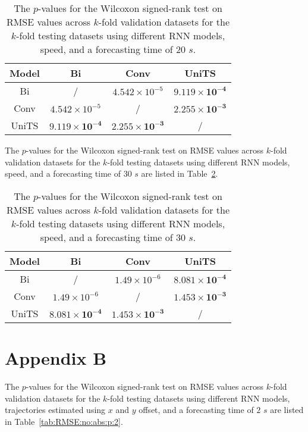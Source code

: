 \begin{table}[!ht]
	\centering
	\begin{tabular}{|c|c|c|c|}
		\hline
		Model & Bi & Conv & UniTS \\ \hline
		Bi & / & $4.542 \times 10^{-5}$ & $\mathbf{9.119 \times 10^{-4}}$ \\ \hline
		Conv & $4.542 \times 10^{-5}$ & / & $\mathbf{2.255 \times 10^{-3}}$ \\ \hline
		UniTS & $\mathbf{9.119 \times 10^{-4}}$ & $\mathbf{2.255 \times 10^{-3}}$ & / \\ \hline
	\end{tabular}
	\caption{The $p$-values for the Wilcoxon signed-rank test on RMSE values across $k$-fold validation datasets for the $k$-fold testing datasets using different RNN models, speed, and a forecasting time of $20$ $s$.}
	\label{tab:RMSE:speed:p:20}
\end{table}

The $p$-values for the Wilcoxon signed-rank test on RMSE values across $k$-fold validation datasets for the $k$-fold testing datasets using different RNN models, speed, and a forecasting time of $30$ $s$ are listed in Table~\ref{tab:RMSE:speed:p:30}.

\begin{table}[!ht]
	\centering
	\begin{tabular}{|c|c|c|c|}
		\hline
		Model & Bi & Conv & UniTS \\ \hline
		Bi & / & $1.49 \times 10^{-6}$ & $\mathbf{8.081 \times 10^{-4}}$ \\ \hline
		Conv & $1.49 \times 10^{-6}$ & / & $\mathbf{1.453 \times 10^{-3}}$ \\ \hline
		UniTS & $\mathbf{8.081 \times 10^{-4}}$ & $\mathbf{1.453 \times 10^{-3}}$ & / \\ \hline
	\end{tabular}
	\caption{The $p$-values for the Wilcoxon signed-rank test on RMSE values across $k$-fold validation datasets for the $k$-fold testing datasets using different RNN models, speed, and a forecasting time of $30$ $s$.}
	\label{tab:RMSE:speed:p:30}
\end{table}

\appendix
\section{Appendix B}
\label{appB}

The $p$-values for the Wilcoxon signed-rank test on RMSE values across $k$-fold validation datasets for the $k$-fold testing datasets using different RNN models, trajectories estimated using $x$ and $y$ offset, and a forecasting time of $2$ $s$ are listed in Table~\ref{tab:RMSE:no:abs:p:2}.

